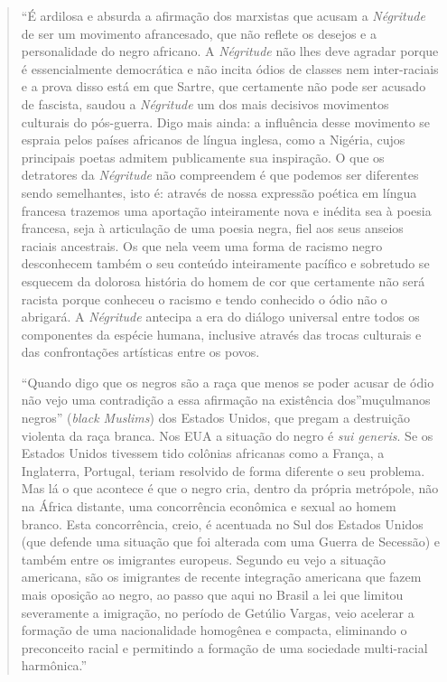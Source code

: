 \documentclass[
  letterpaper,
  DIV=11,
  numbers=noendperiod]{scrreprt}
\begin{document}
\begin{quote}
``É ardilosa e absurda a afirmação dos marxistas que acusam a
\emph{Négritude} de ser um movimento afrancesado, que não reflete os
desejos e a personalidade do negro africano. A \emph{Négritude} não lhes
deve agradar porque é essencialmente democrática e não incita ódios de
classes nem inter-raciais e a prova disso está em que Sartre, que
certamente não pode ser acusado de fascista, saudou a \emph{Négritude}
um dos mais decisivos movimentos culturais do pós-guerra. Digo mais
ainda: a influência desse movimento se espraia pelos países africanos de
língua inglesa, como a Nigéria, cujos principais poetas admitem
publicamente sua inspiração. O que os detratores da \emph{Négritude} não
compreendem é que podemos ser diferentes sendo semelhantes, isto é:
através de nossa expressão poética em língua francesa trazemos uma
aportação inteiramente nova e inédita sea à poesia francesa, seja à
articulação de uma poesia negra, fiel aos seus anseios raciais
ancestrais. Os que nela veem uma forma de racismo negro desconhecem
também o seu conteúdo inteiramente pacífico e sobretudo se esquecem da
dolorosa história do homem de cor que certamente não será racista porque
conheceu o racismo e tendo conhecido o ódio não o abrigará. A
\emph{Négritude} antecipa a era do diálogo universal entre todos os
componentes da espécie humana, inclusive através das trocas culturais e
das confrontações artísticas entre os povos.~

``Quando digo que os negros são a raça que menos se poder acusar de ódio
não vejo uma contradição a essa afirmação na existência dos''muçulmanos
negros'' (\emph{black Muslims}) dos Estados Unidos, que pregam a
destruição violenta da raça branca. Nos EUA a situação do negro é
\emph{sui generis}. Se os Estados Unidos tivessem tido colônias
africanas como a França, a Inglaterra, Portugal, teriam resolvido de
forma diferente o seu problema. Mas lá o que acontece é que o negro
cria, dentro da própria metrópole, não na África distante, uma
concorrência econômica e sexual ao homem branco. Esta concorrência,
creio, é acentuada no Sul dos Estados Unidos (que defende uma situação
que foi alterada com uma Guerra de Secessão) e também entre os
imigrantes europeus. Segundo eu vejo a situação americana, são os
imigrantes de recente integração americana que fazem mais oposição ao
negro, ao passo que aqui no Brasil a lei que limitou severamente a
imigração, no período de Getúlio Vargas, veio acelerar a formação de uma
nacionalidade homogênea e compacta, eliminando o preconceito racial e
permitindo a formação de uma sociedade multi-racial harmônica.''
\end{quote}
\end{document}
